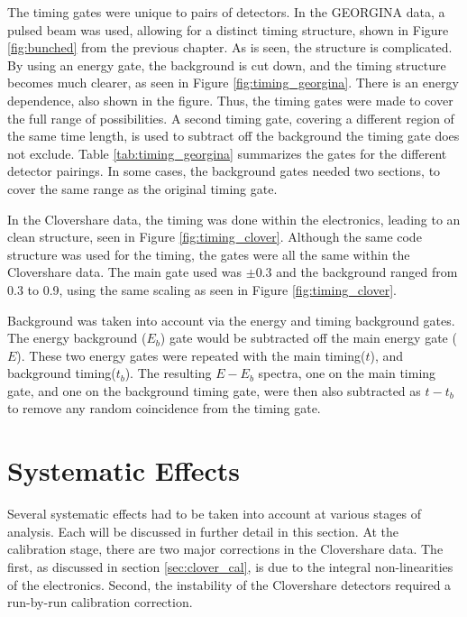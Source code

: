 The timing gates were unique to pairs of detectors. In the GEORGINA data, a pulsed beam was used, allowing for a distinct timing structure, shown in Figure \ref{fig:bunched} from the previous chapter. As is seen, the structure is complicated. By using an energy gate, the background is cut down, and the timing structure becomes much clearer, as seen in Figure \ref{fig:timing_georgina}. There is an energy dependence, also shown in the figure. Thus, the timing gates were made to cover the full range of possibilities. A second timing gate, covering a different region of the same time length, is used to subtract off the background the timing gate does not exclude. Table \ref{tab:timing_georgina} summarizes the gates for the different detector pairings. In some cases, the background gates needed two sections, to cover the same range as the original timing gate.

\afterpage{}



In the Clovershare data, the timing was done within the electronics, leading to an clean structure, seen in Figure \ref{fig:timing_clover}. Although the same code structure was used for the timing, the gates were all the same within the Clovershare data. The main gate used was $\pm0.3$ and the background ranged from 0.3 to 0.9, using the same scaling as seen in Figure \ref{fig:timing_clover}.



Background was taken into account via the energy and timing background gates. The energy background ($E_b$) gate would be subtracted off the main energy gate ($E$). These two energy gates were repeated with the main timing($t$), and background timing($t_b$). The resulting $E-E_b$ spectra, one on the main timing gate, and one on the background timing gate, were then also subtracted as $t-t_b$ to remove any random coincidence from the timing gate.

\section{Systematic Effects}

Several systematic effects had to be taken into account at various stages of analysis. Each will be discussed in further detail in this section. At the calibration stage, there are two major corrections in the Clovershare data. The first, as discussed in section \ref{sec:clover_cal}, is due to the integral non-linearities of the electronics. Second, the instability of the Clovershare detectors required a run-by-run calibration correction. 

